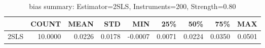 \begin{table}[ht]
\centering
\caption{bias summary: Estimator=2SLS, Instruments=200, Strength=0.80}
\begin{tabular}{lrrrrrrrr}
\toprule
 & COUNT & MEAN & STD & MIN & 25\% & 50\% & 75\% & MAX \\
\midrule
2SLS & 10.0000 & 0.0226 & 0.0178 & -0.0007 & 0.0071 & 0.0224 & 0.0350 & 0.0501 \\
\bottomrule
\end{tabular}
\end{table}
